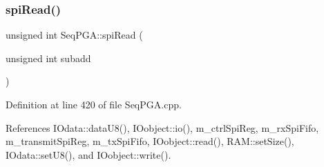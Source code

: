 \mbox{\label{classSeqPGA_a654a40dc597227e59458631f49ff598f}} 
\subsubsection{\texorpdfstring{spi\+Read()}{spiRead()}\hspace{0.1cm}{\footnotesize\ttfamily [3/3]}}
{\footnotesize\ttfamily unsigned int Seq\+P\+G\+A\+::spi\+Read (\begin{DoxyParamCaption}\item[{unsigned int}]{subadd }\end{DoxyParamCaption})}



Definition at line 420 of file Seq\+P\+G\+A.\+cpp.



References I\+Odata\+::data\+U8(), I\+Oobject\+::io(), m\+\_\+ctrl\+Spi\+Reg, m\+\_\+rx\+Spi\+Fifo, m\+\_\+transmit\+Spi\+Reg, m\+\_\+tx\+Spi\+Fifo, I\+Oobject\+::read(), R\+A\+M\+::set\+Size(), I\+Odata\+::set\+U8(), and I\+Oobject\+::write().


